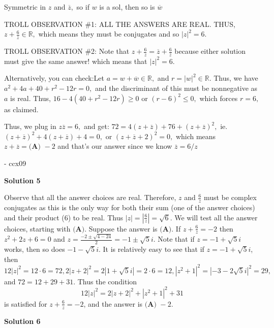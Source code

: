 \begin{enumerate}
 Symmetric in $z$ and $\overline{z},$ so if $w$ is a sol, then so is $\overline{w}$

 TROLL OBSERVATION \#1: ALL THE ANSWERS ARE REAL. THUS, $z + \frac{6}{z} \in \mathbb{R},$ which means they must be conjugates and so $|z|^2 = 6.$

 TROLL OBSERVATION \#2: Note that $z+\frac{6}{z} = \overline{z} + \frac{6}{\overline{z}}$ because either solution must give the same answer! which means that $|z|^2 = 6.$ 

 Alternatively, you can check:Let $a = w + \overline{w} \in \mathbb{R},$ and $r = |w|^2 \in \mathbb{R}.$ Thus, we have $a^2+4a+40+r^2-12r=0,$ and the discriminant of this must be nonnegative as $a$ is real. Thus, $16-4(40+r^2-12r) \geq 0$ or $(r-6)^2 \leq 0,$ which forces $r = 6,$ as claimed.

 Thus, we plug in $z \overline{z} = 6,$ and get: $72 = 4(z + \overline{z}) + 76 + (z + \overline{z})^2,$ ie. $(z+\overline{z})^2 + 4(z + \overline{z}) + 4 = 0,$ or $(z+\overline{z} + 2)^2 = 0,$ which means $z + \overline{z} = \boxed{\textbf{(A) }-2}$ and that's our answer since we know $\overline{z} = 6 / z$

 - ccx09

 



\textbf{Solution 5}

Observe that all the answer choices are real. Therefore, $z$ and $\frac{6}{z}$ must be complex conjugates as this is the only way for both their sum (one of the answer choices) and their product ($6$) to be real. Thus $|z|=|\frac{6}{z}|=\sqrt{6}$. We will test all the answer choices, starting with $\textbf{(A)}$. Suppose the answer is $\textbf{(A)}$. If $z+\frac{6}{z}=-2$ then $z^{2}+2z+6=0$ and $z=\frac{-2\pm\sqrt{4-24}}{2}=-1\pm\sqrt{5}i$. Note that if $z=-1+\sqrt{5}i$ works, then so does $-1-\sqrt{5}i$. It is relatively easy to see that if $z=-1+\sqrt{5}i$, then $12|z|^{2}=12\cdot 6=72, 2|z+2|^{2}=2|1+\sqrt{5}i|=2\cdot 6=12, |z^{2}+1|^{2}=|-3-2\sqrt{5}i|^{2}=29,$ and $72=12+29+31$. Thus the condition 
 \[12|z|^{2}=2|z+2|^{2}+|z^{2}+1|^{2}+31\] is satisfied for $z+\frac{6}{z}=-2$, and the answer is $\boxed{\textbf{(A) }-2}$.

 



\textbf{Solution 6}


\end{enumerate}
